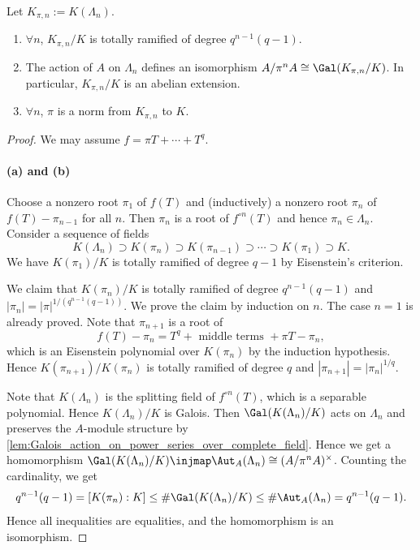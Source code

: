   \begin{theorem}
    Let $K_{\pi, n} := K(\Lambda_n)$.
    \begin{enumerate}
      \item $\forall n$, $K_{\pi, n} / K$ is totally ramified of degree $q^{n-1}(q-1)$.
      \item The action of $A$ on $\Lambda_n$ defines an isomorphism $A / \pi^n A \cong \Gal(K_{\pi, n} / K)$. 
        In particular, $K_{\pi, n} / K$ is an abelian extension.
      \item $\forall n$, $\pi$ is a norm from $K_{\pi, n}$ to $K$.
    \end{enumerate}
  \end{theorem}
  \begin{proof}
    We may assume $f = \pi T + \cdots + T^q$.

    \paragraph{(a) and (b)} 
    Choose a nonzero root $\pi_1$ of $f(T)$ and (inductively) a nonzero root $\pi_n$ of $f(T) - \pi_{n-1}$ for all $n$.
    Then $\pi_n$ is a root of $f^{\circ n}(T)$ and hence $\pi_n \in \Lambda_n$.
    Consider a sequence of fields
    \[ K(\Lambda_n) \supset K(\pi_n) \supset K(\pi_{n-1}) \supset \cdots \supset K(\pi_1) \supset K. \]
    We have $K(\pi_1) / K$ is totally ramified of degree $q-1$ by Eisenstein's criterion.
    
    We claim that $K(\pi_n) / K$ is totally ramified of degree $q^{n-1}(q-1)$ and $|\pi_n| = |\pi|^{1/(q^{n-1}(q-1))}$.
    We prove the claim by induction on $n$.
    The case $n=1$ is already proved.
    Note that $\pi_{n+1}$ is a root of
    \[ f(T) - \pi_n = T^q + \text{ middle terms } + \pi T - \pi_n, \]
    which is an Eisenstein polynomial over $K(\pi_n)$ by the induction hypothesis.
    Hence $K(\pi_{n+1}) / K(\pi_n)$ is totally ramified of degree $q$ and $|\pi_{n+1}| = |\pi_n|^{1/q}$.

    Note that $K(\Lambda_n)$ is the splitting field of $f^{\circ n}(T)$, which is a separable polynomial.
    Hence $K(\Lambda_n) / K$ is Galois.
    Then $\Gal(K(\Lambda_n) / K)$ acts on $\Lambda_n$ and preserves the $A$-module structure by \cref{lem:Galois_action_on_power_series_over_complete_field}.
    Hence we get a homomorphism $\Gal(K(\Lambda_n) / K) \injmap \Aut_A(\Lambda_n) \cong (A / \pi^n A)^\times$.
    Counting the cardinality, we get
    \[ q^{n-1}(q-1) = [K(\pi_n) : K] \leq \# \Gal(K(\Lambda_n) / K) \leq \# \Aut_A(\Lambda_n) = q^{n-1}(q-1). \]
    Hence all inequalities are equalities, and the homomorphism is an isomorphism.


\end{proof}
